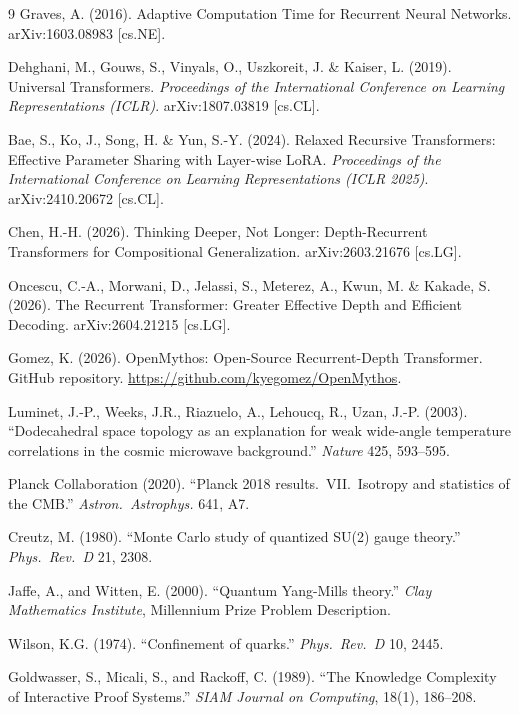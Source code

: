 \begin{thebibliography}{9}
Graves, A. (2016).
Adaptive Computation Time for Recurrent Neural Networks.
arXiv:1603.08983 [cs.NE].

Dehghani, M., Gouws, S., Vinyals, O., Uszkoreit, J. \& Kaiser, L. (2019).
Universal Transformers.
\textit{Proceedings of the International Conference on Learning Representations (ICLR)}.
arXiv:1807.03819 [cs.CL].

Bae, S., Ko, J., Song, H. \& Yun, S.-Y. (2024).
Relaxed Recursive Transformers: Effective Parameter Sharing with Layer-wise LoRA.
\textit{Proceedings of the International Conference on Learning Representations (ICLR 2025)}.
arXiv:2410.20672 [cs.CL].

Chen, H.-H. (2026).
Thinking Deeper, Not Longer: Depth-Recurrent Transformers for Compositional Generalization.
arXiv:2603.21676 [cs.LG].

Oncescu, C.-A., Morwani, D., Jelassi, S., Meterez, A., Kwun, M. \& Kakade, S. (2026).
The Recurrent Transformer: Greater Effective Depth and Efficient Decoding.
arXiv:2604.21215 [cs.LG].

Gomez, K. (2026).
OpenMythos: Open-Source Recurrent-Depth Transformer.
GitHub repository. \url{https://github.com/kyegomez/OpenMythos}.

Luminet, J.-P., Weeks, J.R., Riazuelo, A., Lehoucq, R., Uzan, J.-P. (2003).
``Dodecahedral space topology as an explanation for weak wide-angle temperature correlations in the cosmic microwave background.''
\textit{Nature} 425, 593--595.

Planck Collaboration (2020).
``Planck 2018 results.\ VII.\ Isotropy and statistics of the CMB.''
\textit{Astron.\ Astrophys.} 641, A7.

Creutz, M. (1980).
``Monte Carlo study of quantized SU(2) gauge theory.''
\textit{Phys.\ Rev.\ D} 21, 2308.

Jaffe, A., and Witten, E. (2000).
``Quantum Yang-Mills theory.''
\textit{Clay Mathematics Institute}, Millennium Prize Problem Description.

Wilson, K.G. (1974).
``Confinement of quarks.''
\textit{Phys.\ Rev.\ D} 10, 2445.

Goldwasser, S., Micali, S., and Rackoff, C. (1989).
``The Knowledge Complexity of Interactive Proof Systems.''
\textit{SIAM Journal on Computing}, 18(1), 186--208.


\end{thebibliography}

